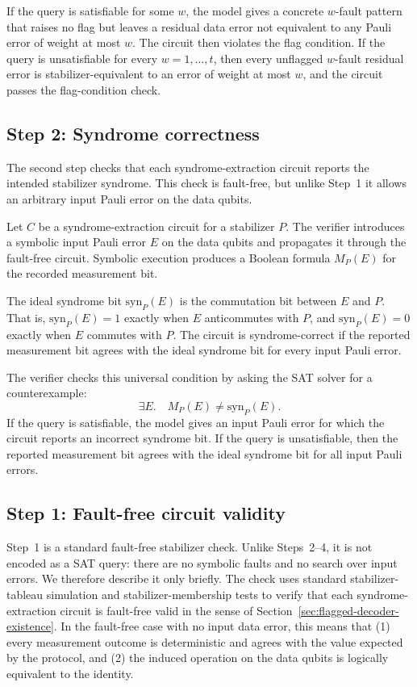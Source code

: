 \documentclass[acmsmall,screen,review,anonymous,nonacm]{acmart}
\begin{document}
If the query is satisfiable for some \(w\), the model gives a concrete \(w\)-fault pattern that raises no flag but leaves a residual data error not equivalent to any Pauli error of weight at most \(w\). The circuit then violates the flag condition. If the query is unsatisfiable for every \(w=1,\ldots,t\), then every unflagged \(w\)-fault residual error is stabilizer-equivalent to an error of weight at most \(w\), and the circuit passes the flag-condition check.

\subsection{Step 2: Syndrome correctness}

The second step checks that each syndrome-extraction circuit reports the intended stabilizer syndrome. This check is fault-free, but unlike Step~1 it allows an arbitrary input Pauli error on the data qubits.

Let \(C\) be a syndrome-extraction circuit for a stabilizer \(P\). The verifier introduces a symbolic input Pauli error \(E\) on the data qubits and propagates it through the fault-free circuit. Symbolic execution produces a Boolean formula \(M_P(E)\) for the recorded measurement bit.

The ideal syndrome bit \(\mathrm{syn}_P(E)\) is the commutation bit between \(E\) and \(P\). That is, \(\mathrm{syn}_P(E)=1\) exactly when \(E\) anticommutes with \(P\), and \(\mathrm{syn}_P(E)=0\) exactly when \(E\) commutes with \(P\). The circuit is syndrome-correct if the reported measurement bit agrees with the ideal syndrome bit for every input Pauli error.

The verifier checks this universal condition by asking the SAT solver for a counterexample:
\[
  \exists E.\quad
  M_P(E)\ne \mathrm{syn}_P(E).
\]
If the query is satisfiable, the model gives an input Pauli error for which the circuit reports an incorrect syndrome bit. If the query is unsatisfiable, then the reported measurement bit agrees with the ideal syndrome bit for all input Pauli errors.

\subsection{Step 1: Fault-free circuit validity}
\label{subsec:fault-free-circuit-validity}

Step~1 is a standard fault-free stabilizer check. Unlike Steps~2--4, it is not encoded as a SAT query: there are no symbolic faults and no search over input errors. We therefore describe it only briefly. The check uses standard stabilizer-tableau simulation and stabilizer-membership tests to verify that each syndrome-extraction circuit is fault-free valid in the sense of Section~\ref{sec:flagged-decoder-existence}. In the fault-free case with no input data error, this means that (1) every measurement outcome is deterministic and agrees with the value expected by the protocol, and (2) the induced operation on the data qubits is logically equivalent to the identity.
\end{document}
